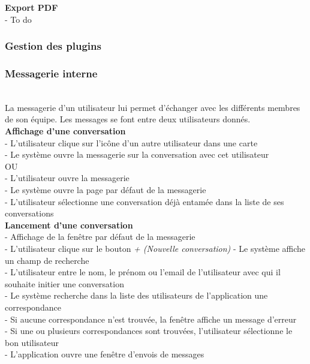\documentclass[conference]{IEEEtran}
\begin{document}
\textbf{Export PDF}\\
- To do\\

\subsubsection{Gestion des plugins}

\subsubsection{Messagerie interne}\hfill\\

La messagerie d'un utilisateur lui permet d'échanger avec les différents membres de son équipe. Les messages se font entre deux utilisateurs donnés.\\

\textbf{Affichage d'une conversation}\\
- L'utilisateur clique sur l'icône d'un autre utilisateur dans une carte\\
- Le système ouvre la messagerie sur la conversation avec cet utilisateur\\
OU\\
- L'utilisateur ouvre la messagerie\\
- Le système ouvre la page par défaut de la messagerie\\
- L'utilisateur sélectionne une conversation déjà entamée dans la liste de ses conversations\\

\textbf{Lancement d'une conversation}\\
- Affichage de la fenêtre par défaut de la messagerie\\
- L'utilisateur clique sur le bouton \textit{+ (Nouvelle conversation)}
- Le système affiche un champ de recherche\\
- L'utilisateur entre le nom, le prénom ou l'email de l'utilisateur avec qui il souhaite initier une conversation\\
- Le système recherche dans la liste des utilisateurs de l'application une correspondance\\
- Si aucune correspondance n'est trouvée, la fenêtre affiche un message d'erreur\\
- Si une ou plusieurs correspondances sont trouvées, l'utilisateur sélectionne le bon utilisateur\\
- L'application ouvre une fenêtre d'envois de messages\\
\end{document}
